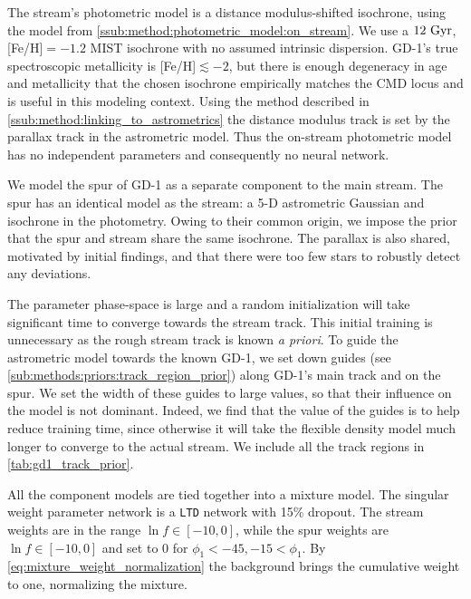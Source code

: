 \documentclass[twocolumn]{aastex631}
\newcommand{\stream}[1]{#1}
\begin{document}
        The stream's photometric model is a distance modulus-shifted isochrone,
        using the model from \autoref{ssub:method:photometric_model:on_stream}.
        We use a $12 \ \rm{Gyr}$, [Fe/H]$ = -1.2$ MIST isochrone with no assumed
        intrinsic dispersion.  \stream{GD-1}'s true spectroscopic metallicity is
        [Fe/H]$\lesssim-2$, but there is enough degeneracy in age and
        metallicity that the chosen isochrone empirically matches the CMD locus
        and is useful in this modeling context.  Using the method described in
        \autoref{ssub:method:linking_to_astrometrics} the distance modulus track
        is set by the parallax track in the astrometric model. Thus the
        on-stream photometric model has no independent parameters and
        consequently no neural network.


        We model the spur of \stream{GD-1} as a separate component to the main
        stream. The spur has an identical model as the stream: a 5-D astrometric
        Gaussian and isochrone in the photometry. Owing to their common origin,
        we impose the prior that the spur and stream share the same isochrone.
        The parallax is also shared, motivated by initial findings, and that
        there were too few stars to robustly detect any deviations.


        The parameter phase-space is large and a random initialization will take
        significant time to converge towards the stream track. This initial
        training is unnecessary as the rough stream track is known \textit{a
        priori}.  To guide the astrometric model towards the known
        \stream{GD-1}, we set down guides (see
        \autoref{sub:methods:priors:track_region_prior}) along \stream{GD-1}'s
        main track and on the spur.  We set the width of these guides to large
        values, so that their influence on the model is not dominant. Indeed, we
        find that the value of the guides is to help reduce training time, since
        otherwise it will take the flexible density model much longer to
        converge to the actual stream.  We include all the track regions in
        \autoref{tab:gd1_track_prior}.

        All the component models are tied together into a mixture model.  The
        singular weight parameter network is a \texttt{LTD} network with 15\%
        dropout.  The stream weights are in the range $\ln f \in [-10, 0]$,
        while the spur weights are $\ln f \in [-10, 0]$ and set to 0 for $\phi_1
        < -45, -15 < \phi_1$.  By \autoref{eq:mixture_weight_normalization} the
        background brings the cumulative weight to one, normalizing the mixture.
\end{document}
